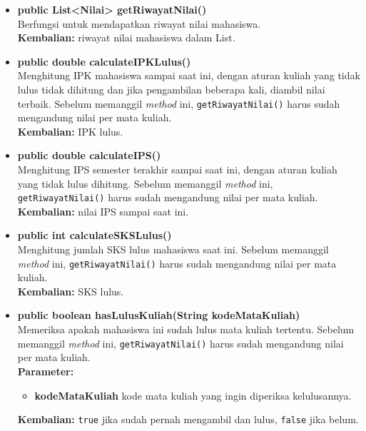 \documentclass[a4paper,twoside]{article}
\begin{document}
\begin{enumerate}
\begin{enumerate}
\begin{enumerate}
\begin{enumerate}
\begin{itemize}
			\item \textbf{public List<Nilai> getRiwayatNilai()}\\
				Berfungsi untuk mendapatkan riwayat nilai mahasiswa.\\
				\textbf{Kembalian:} riwayat nilai mahasiswa dalam List.
				
			\item \textbf{public double calculateIPKLulus()}\\
				Menghitung IPK mahasiswa sampai saat ini, dengan aturan kuliah yang tidak lulus tidak dihitung dan jika pengambilan beberapa kali, diambil nilai terbaik. Sebelum memanggil \textit{method} ini, \texttt{getRiwayatNilai()} harus sudah mengandung nilai per mata kuliah.\\
				\textbf{Kembalian:} IPK lulus.
				
			\item \textbf{public double calculateIPS()}\\
				Menghitung IPS semester terakhir sampai saat ini, dengan aturan kuliah yang tidak lulus dihitung. Sebelum memanggil \textit{method} ini, \texttt{getRiwayatNilai()} harus sudah mengandung nilai per mata kuliah.\\
				\textbf{Kembalian:}  nilai IPS sampai saat ini.
				
			\item \textbf{public int calculateSKSLulus()}\\
				Menghitung jumlah SKS lulus mahasiswa saat ini. Sebelum memanggil \textit{method} ini, \texttt{getRiwayatNilai()} harus sudah mengandung nilai per mata kuliah.\\
				\textbf{Kembalian:} SKS lulus.
				
			\item \textbf{public boolean hasLulusKuliah(String kodeMataKuliah)}\\
				Memeriksa apakah mahasiswa ini sudah lulus mata kuliah tertentu. Sebelum memanggil \textit{method} ini, \texttt{getRiwayatNilai()} harus sudah mengandung nilai per mata kuliah.\\
				\textbf{Parameter:}
				\begin{itemize}
					\item \textbf{kodeMataKuliah} kode mata kuliah yang ingin diperiksa kelulusannya.
				\end{itemize}
				\textbf{Kembalian:} \texttt{true} jika sudah pernah mengambil dan lulus, \texttt{false} jika belum.
				

\end{itemize}
\end{enumerate}
\end{enumerate}
\end{enumerate}
\end{enumerate}
\end{document}
